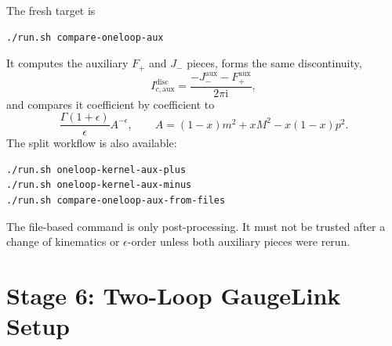 \documentclass[11pt]{article}
\newcommand{\ii}{\mathrm{i}}
\newcommand{\eps}{\epsilon}
\begin{document}
The fresh target is
\begin{verbatim}
./run.sh compare-oneloop-aux
\end{verbatim}
It computes the auxiliary \(F_+\) and \(J_-\) pieces, forms the same
discontinuity,
\begin{equation}
  I_{c,\mathrm{aux}}^{\mathrm{disc}}
  =
  \frac{-J_-^{\mathrm{aux}}-F_+^{\mathrm{aux}}}{2\pi\ii},
\end{equation}
and compares it coefficient by coefficient to
\begin{equation}
  \frac{\Gamma(1+\eps)}{\eps}A^{-\eps},
  \qquad
  A=(1-x)m^2+xM^2-x(1-x)p^2.
\end{equation}
The split workflow is also available:
\begin{verbatim}
./run.sh oneloop-kernel-aux-plus
./run.sh oneloop-kernel-aux-minus
./run.sh compare-oneloop-aux-from-files
\end{verbatim}
The file-based command is only post-processing. It must not be trusted after a
change of kinematics or \(\eps\)-order unless both auxiliary pieces were rerun.

\section{Stage 6: Two-Loop GaugeLink Setup}
\end{document}
